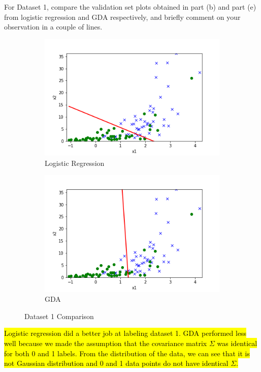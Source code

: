 \item {}
For Dataset 1, compare the validation set plots obtained in part (b) and part (e)
from logistic regression and GDA respectively, and briefly comment on your observation in a couple of lines.\\[50pt]

\begin{figure}[H]
    \centering
    \begin{subfigure}{.5\textwidth}
      \centering
      \includegraphics[width=0.95\linewidth]{./linearclass/src/lr_image1.png}
      \caption{Logistic Regression}
    \end{subfigure}%
    \begin{subfigure}{.5\textwidth}
      \centering
      \includegraphics[width=0.95\linewidth]{./linearclass/src/gda_image1.png}
      \caption{GDA}
    \end{subfigure}
    \caption{Dataset 1 Comparison}%
\end{figure}

\hl{Logistic regression did a better job at labeling dataset 1. GDA performed less well because we made the assumption that the covariance matrix $\Sigma$ was identical for both 0 and 1 labels. From the distribution of the data, we can see that it is not Gaussian distribution and 0 and 1 data points do not have identical $\Sigma$.}
